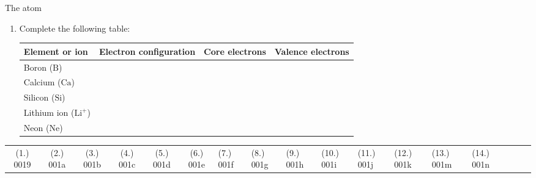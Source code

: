 \begin{eocexercises}{The atom}
\begin{enumerate}[noitemsep, label=\textbf{\arabic*}. ]
            \item Complete the following table:
          \begin{table}[H]
        \begin{center}
      \label{m38741*eip-282}
    \noindent
      \begin{tabular}{|l|l|l|l|}\hline
        Element or ion &
        Electron configuration &
        Core electrons &
        Valence electrons \\ \hline
        Boron ($\text{B}$) &
         &
         &
       \\ \hline
        Calcium ($\text{Ca}$) &
         &
         &
     \\ \hline
        Silicon ($\text{Si}$) &
         &
         &
       \\ \hline
        Lithium ion ($\text{Li}^{+}$) &
         &
         &
      \\ \hline
        Neon ($\text{Ne}$) &
         &
         &
     \\ \hline
    \end{tabular}
      \end{center}
\end{table}
\end{enumerate}
  \label{m38741**end}
  \label{ea1c9e59656f96ee804546971cf6dee6**end}
 \practiceinfo
 \begin{tabular}[h]{cccccc}
 (1.) 0019  &  (2.) 001a  &  (3.) 001b  &  (4.) 001c  &  (5.) 001d  &  (6.) 001e  &  (7.) 001f  &  (8.) 001g  &  (9.) 001h  &  (10.) 001i  &  (11.) 001j  &  (12.) 001k  &  (13.) 001m  &  (14.) 001n  &  & &  & \end{tabular}

\end{eocexercises}
